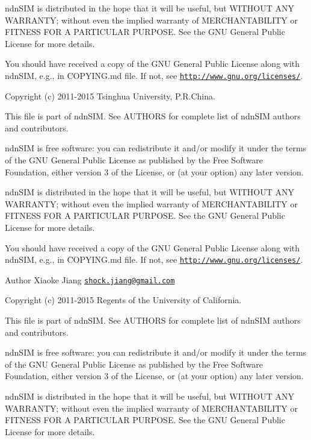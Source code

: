 ndn\+S\+IM is distributed in the hope that it will be useful, but W\+I\+T\+H\+O\+UT A\+NY W\+A\+R\+R\+A\+N\+TY; without even the implied warranty of M\+E\+R\+C\+H\+A\+N\+T\+A\+B\+I\+L\+I\+TY or F\+I\+T\+N\+E\+SS F\+OR A P\+A\+R\+T\+I\+C\+U\+L\+AR P\+U\+R\+P\+O\+SE. See the G\+NU General Public License for more details.

You should have received a copy of the G\+NU General Public License along with ndn\+S\+IM, e.\+g., in C\+O\+P\+Y\+I\+N\+G.\+md file. If not, see \href{http://www.gnu.org/licenses/}{\tt http\+://www.\+gnu.\+org/licenses/}.

Copyright (c) 2011-\/2015 Tsinghua University, P.\+R.\+China.

This file is part of ndn\+S\+IM. See A\+U\+T\+H\+O\+RS for complete list of ndn\+S\+IM authors and contributors.

ndn\+S\+IM is free software\+: you can redistribute it and/or modify it under the terms of the G\+NU General Public License as published by the Free Software Foundation, either version 3 of the License, or (at your option) any later version.

ndn\+S\+IM is distributed in the hope that it will be useful, but W\+I\+T\+H\+O\+UT A\+NY W\+A\+R\+R\+A\+N\+TY; without even the implied warranty of M\+E\+R\+C\+H\+A\+N\+T\+A\+B\+I\+L\+I\+TY or F\+I\+T\+N\+E\+SS F\+OR A P\+A\+R\+T\+I\+C\+U\+L\+AR P\+U\+R\+P\+O\+SE. See the G\+NU General Public License for more details.

You should have received a copy of the G\+NU General Public License along with ndn\+S\+IM, e.\+g., in C\+O\+P\+Y\+I\+N\+G.\+md file. If not, see \href{http://www.gnu.org/licenses/}{\tt http\+://www.\+gnu.\+org/licenses/}.

\begin{DoxyAuthor}{Author}
Xiaoke Jiang \href{mailto:shock.jiang@gmail.com}{\tt shock.\+jiang@gmail.\+com}
\end{DoxyAuthor}
Copyright (c) 2011-\/2015 Regents of the University of California.

This file is part of ndn\+S\+IM. See A\+U\+T\+H\+O\+RS for complete list of ndn\+S\+IM authors and contributors.

ndn\+S\+IM is free software\+: you can redistribute it and/or modify it under the terms of the G\+NU General Public License as published by the Free Software Foundation, either version 3 of the License, or (at your option) any later version.

ndn\+S\+IM is distributed in the hope that it will be useful, but W\+I\+T\+H\+O\+UT A\+NY W\+A\+R\+R\+A\+N\+TY; without even the implied warranty of M\+E\+R\+C\+H\+A\+N\+T\+A\+B\+I\+L\+I\+TY or F\+I\+T\+N\+E\+SS F\+OR A P\+A\+R\+T\+I\+C\+U\+L\+AR P\+U\+R\+P\+O\+SE. See the G\+NU General Public License for more details.

